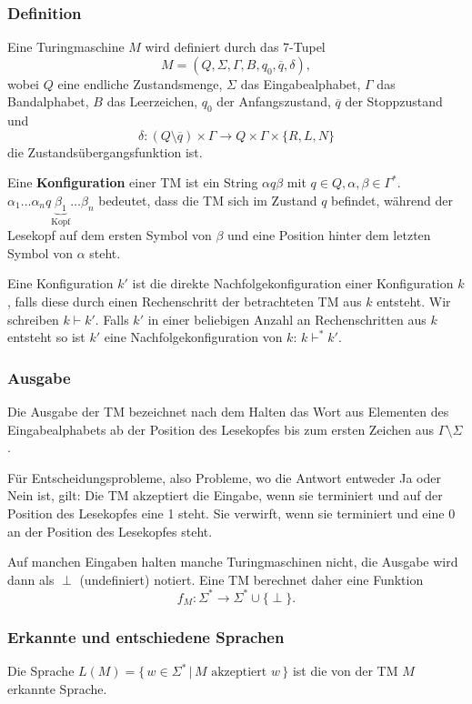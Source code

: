 \documentclass[a4paper,parskip=half*,DIV=7,fontsize=11pt]{scrartcl}
\begin{document}
\subsubsection{Definition}
Eine Turingmaschine $M$ wird definiert durch das 7-Tupel $$M= (Q, \Sigma,\Gamma, B, q_0, \overline{q}, \delta),$$ wobei $Q$ eine endliche Zustandsmenge, $\Sigma$ das Eingabealphabet, $\Gamma$ das Bandalphabet, $B$ das Leerzeichen, $q_0$ der Anfangszustand, $\overline{q}$ der Stoppzustand und \[\delta : (Q \setminus \overline{q}) \times \Gamma \to Q \times \Gamma \times \{R,L,N\}\]
die Zustandsübergangsfunktion ist.

Eine \textbf{Konfiguration} einer TM ist ein String $\alpha q\beta$ mit $q \in Q, \alpha,\beta \in \Gamma^* $. $\alpha_1\ldots \alpha_n q \underbrace{\beta_1}_{\text{Kopf}}\ldots \beta_n$ bedeutet, dass die TM sich im Zustand $q$ befindet, während der Lesekopf auf dem ersten Symbol von $\beta$ und eine Position hinter dem letzten Symbol von $\alpha$ steht.

Eine Konfiguration $k'$ ist die direkte Nachfolgekonfiguration einer Konfiguration $k$, falls  diese durch einen Rechenschritt der betrachteten TM aus $k$ entsteht. Wir schreiben $k \vdash k'$.  Falls $k'$ in einer beliebigen Anzahl an  Rechenschritten aus $k$ entsteht so ist $k'$ eine Nachfolgekonfiguration von $k$: $k \vdash^* k'$.

\subsubsection{Ausgabe}
Die Ausgabe der TM bezeichnet nach dem Halten das Wort aus Elementen des Eingabealphabets ab der Position des Lesekopfes bis zum ersten Zeichen aus $\Gamma \setminus \Sigma$. 

Für Entscheidungsprobleme, also Probleme, wo die Antwort entweder Ja oder Nein ist, gilt:
Die TM akzeptiert die Eingabe, wenn sie terminiert und auf der Position des Lesekopfes eine 1 steht. Sie verwirft, wenn sie terminiert und eine 0 an der Position des Lesekopfes steht.

Auf manchen Eingaben halten manche Turingmaschinen nicht, die Ausgabe wird dann als $\perp$ (undefiniert) notiert. Eine TM berechnet daher eine Funktion $$f_M : \Sigma^* \to \Sigma^* \cup \{ \perp\}.$$

\subsubsection{Erkannte und entschiedene Sprachen}
Die Sprache $L(M) = \{\, w \in \Sigma^\ast \,\vert\, M \text{ akzeptiert } w\,\}$ ist die von der TM $M$ erkannte Sprache.
\end{document}
